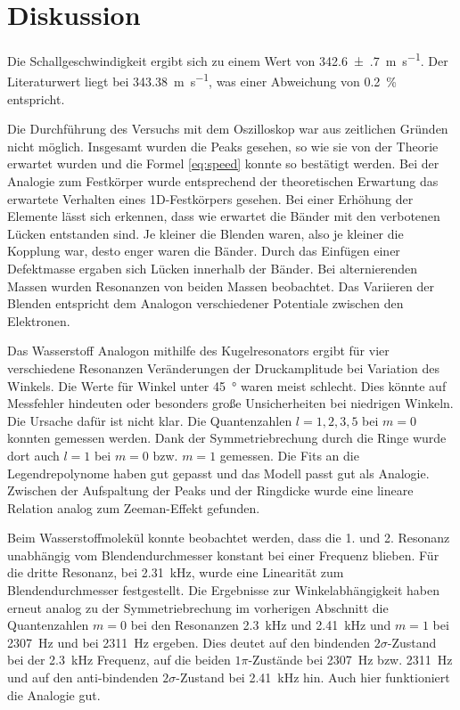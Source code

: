 \section{Diskussion}
\label{sec:Diskussion}

Die Schallgeschwindigkeit ergibt sich zu einem Wert von \SI{342.6(7)}{\meter\per\second}. Der Literaturwert liegt bei \SI{343.38}{\meter\per\second}, was einer Abweichung von \SI{0.2}{\percent} entspricht. 

Die Durchführung des Versuchs mit dem Oszilloskop war aus zeitlichen Gründen nicht möglich. 
Insgesamt wurden die Peaks gesehen, so wie sie von der Theorie erwartet wurden und die Formel \eqref{eq:speed} konnte so bestätigt werden. 
Bei der Analogie zum Festkörper wurde entsprechend der theoretischen Erwartung das erwartete Verhalten eines 1D-Festkörpers gesehen. Bei einer Erhöhung der Elemente lässt sich erkennen, dass wie erwartet die Bänder mit den verbotenen Lücken entstanden sind. Je kleiner die Blenden waren, also je kleiner die Kopplung war, desto enger waren die Bänder. 
Durch das Einfügen einer Defektmasse ergaben sich Lücken innerhalb der Bänder. 
Bei alternierenden Massen wurden Resonanzen von beiden Massen beobachtet.
Das Variieren der Blenden entspricht dem Analogon verschiedener Potentiale zwischen den Elektronen. 

Das Wasserstoff Analogon mithilfe des Kugelresonators ergibt für vier verschiedene Resonanzen Veränderungen der Druckamplitude bei Variation des Winkels. Die Werte für Winkel unter \SI{45}{\degree} waren meist schlecht. Dies könnte auf Messfehler hindeuten oder besonders große Unsicherheiten bei niedrigen Winkeln. Die Ursache dafür ist nicht klar. 
Die Quantenzahlen $l=1,2,3,5$ bei $m=0$ konnten gemessen werden. Dank der Symmetriebrechung durch die Ringe wurde dort auch $l = 1$ bei $m=0$ bzw. $m=1$ gemessen. Die Fits an die Legendrepolynome haben gut gepasst und das Modell passt gut als Analogie. 
Zwischen der Aufspaltung der Peaks und der Ringdicke wurde eine lineare Relation analog zum Zeeman-Effekt gefunden. 

Beim Wasserstoffmolekül konnte beobachtet werden, dass die 1. und 2. Resonanz  unabhängig vom Blendendurchmesser konstant bei einer Frequenz blieben. 
Für die dritte Resonanz, bei \SI{2.31}{\kilo\hertz}, wurde eine Linearität zum Blendendurchmesser festgestellt.
Die Ergebnisse zur Winkelabhängigkeit haben erneut analog zu der Symmetriebrechung im vorherigen Abschnitt die Quantenzahlen $m = 0$ bei den Resonanzen \SI{2.3}{\kilo\hertz} und \SI{2.41}{\kilo\hertz} und $m = 1$ bei \SI{2307}{\hertz} und bei \SI{2311}{\hertz} ergeben. Dies deutet auf den bindenden $2 \sigma$-Zustand bei der \SI{2.3}{\kilo\hertz} Frequenz, auf die beiden $1 \pi$-Zustände bei \SI{2307}{\hertz} bzw. \SI{2311}{\hertz} und auf den anti-bindenden $2 \sigma$-Zustand bei \SI{2.41}{\kilo\hertz} hin. 
Auch hier funktioniert die Analogie gut.